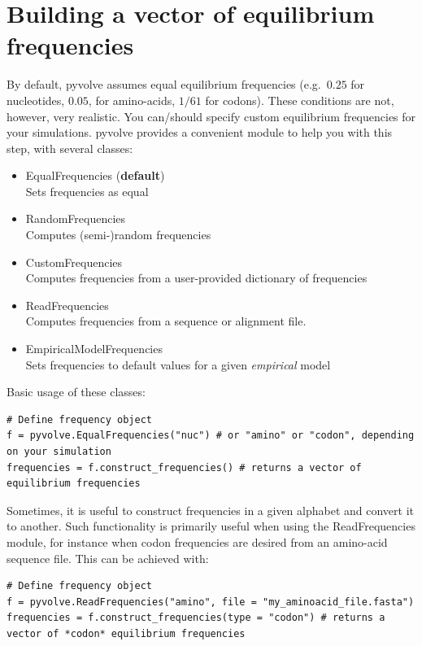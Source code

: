 \documentclass{article}
\begin{document}
\section{Building a vector of equilibrium frequencies}\label{sec:freqs}

By default, pyvolve assumes equal equilibrium frequencies (e.g.\ $0.25$ for nucleotides, $0.05$, for amino-acids, $1/61$ for codons). These conditions are not, however, very realistic. You can/should specify custom equilibrium frequencies for your simulations. pyvolve provides a convenient module to help you with this step, with several classes:
\begin{itemize}
	\item EqualFrequencies (\textbf{default}) \\ Sets frequencies as equal 
	\item RandomFrequencies \\ Computes (semi-)random frequencies
	\item CustomFrequencies \\ Computes frequencies from a user-provided dictionary of frequencies
	\item ReadFrequencies \\ Computes frequencies from a sequence or alignment file.
	\item EmpiricalModelFrequencies \\ Sets frequencies to default values for a given \emph{empirical} model		
\end{itemize}

Basic usage of these classes:
\begin{lstlisting}
# Define frequency object
f = pyvolve.EqualFrequencies("nuc") # or "amino" or "codon", depending on your simulation
frequencies = f.construct_frequencies() # returns a vector of equilibrium frequencies
\end{lstlisting}
 
Sometimes, it is useful to construct frequencies in a given alphabet and convert it to another. Such functionality is primarily useful when using the ReadFrequencies module, for instance when codon frequencies are desired from an amino-acid sequence file. This can be achieved with:
\begin{lstlisting}
# Define frequency object
f = pyvolve.ReadFrequencies("amino", file = "my_aminoacid_file.fasta")
frequencies = f.construct_frequencies(type = "codon") # returns a vector of *codon* equilibrium frequencies
\end{lstlisting}
\end{document}
